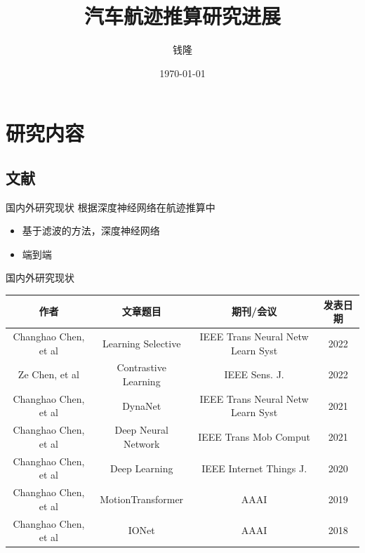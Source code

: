 \documentclass{beamer} %
\title{汽车航迹推算研究进展}
\author{钱隆}
\institute{武汉大学测绘遥感信息工程国家重点实验室}
\date{\today}
\begin{document}
\kaishu

\begin{frame} %
    \titlepage

\end{frame}

\begin{frame}
    \tableofcontents[sectionstyle=show,subsectionstyle=show/shaded/hide,subsubsectionstyle=show/shaded/hide]
\end{frame}


\section{研究内容}

\subsection{文献}

\begin{frame}{国内外研究现状}
    根据深度神经网络在航迹推算中
    \begin{itemize}
        \item 基于滤波的方法，深度神经网络
        \item 端到端
    \end{itemize}
\end{frame}

\begin{frame}{国内外研究现状}
    
    \begin{table}
    \tiny
        \begin{tabular}{cccc}
            \toprule
            作者 & 文章题目 & 期刊/会议 & 发表日期 \\
            \midrule
            Changhao Chen, et al & Learning Selective\cite{chen2022learning} & IEEE Trans Neural Netw Learn Syst & 2022 \\
            Ze Chen, et al & Contrastive Learning\cite{chen2022contrastive} & IEEE Sens. J. & 2022 \\
            Changhao Chen, et al & DynaNet\cite{chen2021dynanet} & IEEE Trans Neural Netw Learn Syst & 2021 \\
            Changhao Chen, et al & Deep Neural Network\cite{chen2021deep} & IEEE Trans Mob Comput & 2021 \\
            Changhao Chen, et al & Deep Learning\cite{chen2020deep} & IEEE Internet Things J. & 2020 \\
            Changhao Chen, et al & MotionTransformer\cite{chen2018transferring} & AAAI & 2019 \\
            Changhao Chen, et al & IONet\cite{chen2018ionet} & AAAI & 2018 \\
            \bottomrule
        \end{tabular}
    \end{table}
\end{frame}
\end{document}
